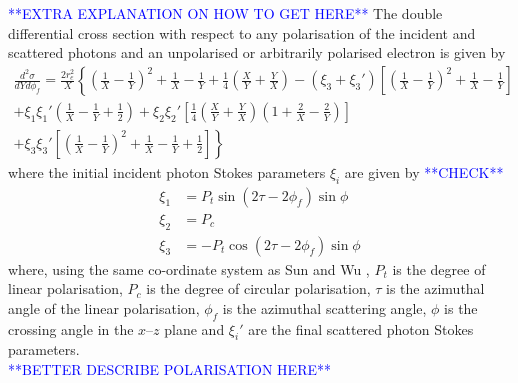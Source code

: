 \documentclass[../main.tex]{subfiles}
\begin{document}
\textcolor{blue}{**EXTRA EXPLANATION ON HOW TO GET HERE**}
The double differential cross section with respect to any polarisation of the incident and scattered photons and an unpolarised or arbitrarily polarised electron is given by 
\begin{multline}
\frac{d^{2}\sigma}{dYd\phi_{f}} = \frac{2r_{e}^{2}}{X}\left\{\left(\frac{1}{X}-\frac{1}{Y}\right)^{2}+\frac{1}{X}-\frac{1}{Y}+\frac{1}{4}\left(\frac{X}{Y}+\frac{Y}{X}\right)  -\left(\xi_{3}+\xi_{3}'\right)\left[\left(\frac{1}{X}-\frac{1}{Y}\right)^{2}+\frac{1}{X}-\frac{1}{Y}\right] \right.\\\left. +\xi_{1}\xi_{1}'\left(\frac{1}{X}-\frac{1}{Y}+\frac{1}{2}\right) + \xi_{2}\xi_{2}'\left[\frac{1}{4}\left(\frac{X}{Y}+\frac{Y}{X}\right)\left(1+\frac{2}{X}-\frac{2}{Y}\right)\right] \right.\\\left. + \xi_{3}\xi_{3}'\left[\left(\frac{1}{X}-\frac{1}{Y}\right)^{2}+\frac{1}{X}-\frac{1}{Y}+\frac{1}{2}\right] \right\}
\label{eq:polarisation_differential_cross_section}    
\end{multline}
where the initial incident photon Stokes parameters $\xi_{i}$ are given by \textcolor{blue}{**CHECK**}
\begin{align}
\xi_{1} &= P_{t}\sin\left(2\tau-2\phi_{f}\right)\sin\phi\\
\xi_{2} &= P_{c} \\
\xi_{3} &= -P_{t}\cos\left(2\tau-2\phi_{f}\right)\sin\phi
\label{eq:incident_stokes_parameters}    
\end{align}
where, using the same co-ordinate system as Sun and Wu \cite{sun2009characterizations,sun2011theoretical}, $P_{t}$ is the degree of linear polarisation, $P_{c}$ is the degree of circular polarisation, $\tau$ is the azimuthal angle of the linear polarisation, $\phi_{f}$ is the azimuthal scattering angle, $\phi$ is the crossing angle in the $x$--$z$ plane and $\xi_{i}'$ are the final scattered photon Stokes parameters. \textcolor{blue}{\\**BETTER DESCRIBE POLARISATION HERE**}
\end{document}
